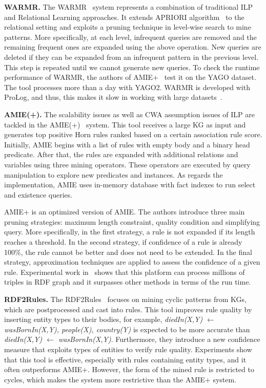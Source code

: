 \textbf{WARMR.} The WARMR~\cite{ref16, ref17} system represents a combination of traditional ILP and Relational Learning approaches. It extends APRIORI algorithm~\cite{ref44} to the relational setting and exploits a pruning technique in level-wise search to mine patterns. More specifically, at each level, infrequent queries are removed and the remaining frequent ones are expanded using the above operation. New queries are deleted if they can be expanded from an infrequent pattern in the previous level. This step is repeated until we cannot generate new queries. To check the runtime performance of WARMR, the authors of AMIE+~\cite{ref10} test it on the YAGO dataset. The tool processes more than a day with YAGO2. WARMR is developed with ProLog, and thus, this makes it slow in working with large datasets~\cite{ref10}.

\textbf{AMIE(+).} The scalability issues as well as CWA assumption issues of ILP are tackled in the AMIE(+)~\cite{ref10} system. This tool receives a large KG as input and generates top positive Horn rules ranked based on a certain association rule score. Initially, AMIE begins with a list of rules with empty body and a binary head predicate. After that, the rules are expanded with additional relations and variables using three mining operators. These operators are executed by query manipulation to explore new predicates and instances. As regards the implementation, AMIE uses in-memory database with fact indexes to run select and existence queries.

AMIE+ is an optimized version of AMIE. The authors introduce three main pruning strategies: maximum length constraint, quality condition and simplifying query. More specifically, in the first strategy, a rule is not expanded if its length reaches a threshold. In the second strategy, if confidence of a rule is already 100\%, the rule cannot be better and does not need to be extended. In the final strategy, approximation techniques are applied to assess the confidence of a given rule. Experimental work in~\cite{ref10} shows that this platform can process millions of triples in RDF graph and it surpasses other methods in terms of the run time.

\textbf{RDF2Rules.} The RDF2Rules~\cite{ref29} focuses on mining cyclic patterns from KGs, which are postprocessed and cast into rules. This tool improves rule quality by inserting entity types to their bodies, for example, \textit{diedIn(X,Y) $\leftarrow$ wasBornIn(X,Y), people(X), country(Y)} is expected to be more accurate than \textit{diedIn(X,Y) $\leftarrow$ wasBornIn(X,Y)}. Furthermore, they introduce a new confidence measure that exploits types of entities to verify rule quality. Experiments show that this tool is effective, especially with rules containing entity types, and it often outperforms AMIE+. However, the form of the mined rule is restricted to cycles, which makes the system more restrictive than the AMIE+ system.

